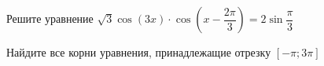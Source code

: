 \begin{ex}
	\begin{condition}
		\begin{enumcols}[label=\asbuk*)]
			\item Решите уравнение \( \sqrt{3}\cos{(3x)}\cdot\cos{\left(x - \dfrac{2\pi}{3}\right)} = 2\sin{\dfrac{\pi}{3}}  \)
			\item Найдите все корни уравнения, принадлежащие отрезку \(  \left[-\pi;3\pi\right] \)
		\end{enumcols}
	\end{condition}
\end{ex}